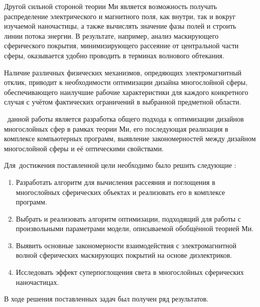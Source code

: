 Другой сильной стороной теории Ми является возможность получать
распределение электрического и магнитного поля, как внутри, так и
вокруг изучаемой наночастицы, а также  вычислять
значение фазы полей и строить линии потока энергии. В результате,
например, анализ маскирующего сферического покрытия,
минимизирующего рассеяние от центральной части сферы, оказывается
удобно проводить в терминах волнового обтекания.

Наличие различных физических механизмов, опредяющих электромагнитный
отклик, приводит к необходимости оптимизации дизайна многослойной
сферы, обеспечивающего наилучшие рабочие характеристики для каждого
конкретного случая с учётом фактических ограничений в выбранной
предметной области.


\aim\ данной работы является разработка общего подхода к оптимизации
дизайнов многослойных сфер в рамках теории Ми, его последующая
реализация в комплексе компьютерных программ, выявление
закономерностей между дизайном многослойной сферы и её оптическими
свойствами.

Для~достижения поставленной цели необходимо было решить следующие {\tasks}:
\begin{enumerate}
  \item Разработать алгоритм для вычисления рассеяния и поглощения в
    многослойных сферических объектах и реализовать его в комплексе программ.
  \item Выбрать и реализовать алгоритм оптимизации, подходящий для
    работы с произвольными параметрами модели, описываемой обобщённой
    теорией Ми.
  \item Выявить основные закономерности взаимодействия с
    электромагнитной волной сферических маскирующих покрытий на
    основе диэлектриков.
  \item Исследовать эффект суперпоглощения света в многослойных
    сферических наночастицах.
\end{enumerate}
В ходе решения поставленных задач был получен ряд результатов.

